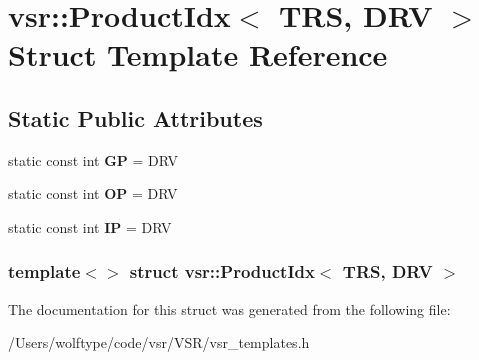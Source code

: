 \hypertarget{structvsr_1_1_product_idx_3_01_t_r_s_00_01_d_r_v_01_4}{\section{vsr\-:\-:Product\-Idx$<$ T\-R\-S, D\-R\-V $>$ Struct Template Reference}
\label{structvsr_1_1_product_idx_3_01_t_r_s_00_01_d_r_v_01_4}
}
\subsection*{Static Public Attributes}
\begin{DoxyCompactItemize}
\item 
\hypertarget{structvsr_1_1_product_idx_3_01_t_r_s_00_01_d_r_v_01_4_a46501616415e558923ef88b9df043220}{static const int {\bfseries G\-P} = D\-R\-V}\label{structvsr_1_1_product_idx_3_01_t_r_s_00_01_d_r_v_01_4_a46501616415e558923ef88b9df043220}

\item 
\hypertarget{structvsr_1_1_product_idx_3_01_t_r_s_00_01_d_r_v_01_4_a1374a1693141d4d47912fe943e188282}{static const int {\bfseries O\-P} = D\-R\-V}\label{structvsr_1_1_product_idx_3_01_t_r_s_00_01_d_r_v_01_4_a1374a1693141d4d47912fe943e188282}

\item 
\hypertarget{structvsr_1_1_product_idx_3_01_t_r_s_00_01_d_r_v_01_4_a4a523649bd282be786678a63dc268a99}{static const int {\bfseries I\-P} = D\-R\-V}\label{structvsr_1_1_product_idx_3_01_t_r_s_00_01_d_r_v_01_4_a4a523649bd282be786678a63dc268a99}

\end{DoxyCompactItemize}
\subsubsection*{template$<$$>$ struct vsr\-::\-Product\-Idx$<$ T\-R\-S, D\-R\-V $>$}



The documentation for this struct was generated from the following file\-:\begin{DoxyCompactItemize}
\item 
/\-Users/wolftype/code/vsr/\-V\-S\-R/vsr\-\_\-templates.\-h\end{DoxyCompactItemize}
